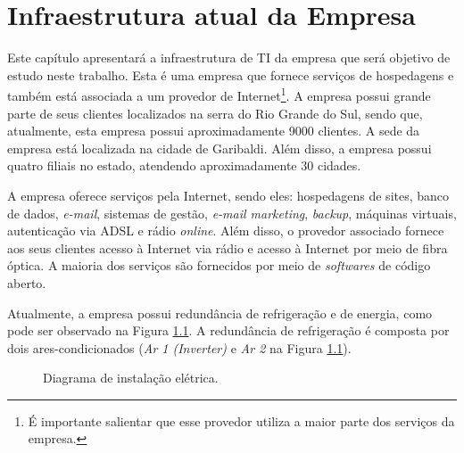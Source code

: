 \chapter{Infraestrutura atual da Empresa}
\label{cap:infraempresa}

Este capítulo apresentará a infraestrutura de \ac{TI} da empresa que será objetivo de estudo neste trabalho. Esta é uma empresa que fornece 
serviços de hospedagens e também está associada a um provedor de Internet\footnote[1]{É importante salientar que esse provedor utiliza a maior 
parte dos serviços da empresa.}. A empresa possui grande parte de seus clientes localizados na serra do Rio Grande do Sul, sendo que, atualmente, 
esta empresa possui aproximadamente 9000 clientes. A sede da empresa está localizada na cidade de Garibaldi. Além disso, a empresa possui quatro 
filiais no estado, atendendo aproximadamente 30 cidades.

A empresa oferece serviços pela Internet, sendo eles: hospedagens de sites, banco de dados, \textit{e-mail}, sistemas de gestão, 
\textit{e-mail marketing}, \textit{backup}, máquinas virtuais, autenticação via \ac{ADSL} e rádio \textit{online}. Além disso, o provedor 
associado fornece aos seus clientes acesso à Internet via rádio e acesso à Internet por meio de fibra óptica. 
A maioria dos serviços são fornecidos por meio de \textit{softwares} de código aberto.

Atualmente, a empresa possui redundância de refrigeração e de energia, como pode ser observado na Figura \ref{fig:insteletrica}. 
A redundância de refrigeração é composta por dois ares-condicionados (\textit{Ar 1 (Inverter)} e \textit{Ar 2} na Figura \ref{fig:insteletrica}). 

\begin{figure}[h!]
 \centering
 \caption{Diagrama de instalação elétrica.}
 \label{fig:insteletrica}
\end{figure}

